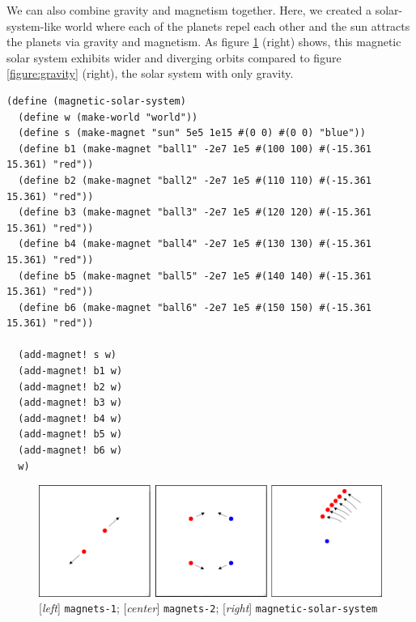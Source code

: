 \documentclass{article}
\begin{document}
We can also combine gravity and magnetism together. Here, we created a solar-system-like world where each of the planets repel each other and the sun attracts the planets via gravity and magnetism. As figure \ref{figure:magnetism} (right) shows, this magnetic solar system exhibits wider and diverging orbits compared to figure \ref{figure:gravity} (right), the solar system with only gravity. 
{\small\begin{verbatim}
(define (magnetic-solar-system)
  (define w (make-world "world"))
  (define s (make-magnet "sun" 5e5 1e15 #(0 0) #(0 0) "blue"))
  (define b1 (make-magnet "ball1" -2e7 1e5 #(100 100) #(-15.361 15.361) "red"))
  (define b2 (make-magnet "ball2" -2e7 1e5 #(110 110) #(-15.361 15.361) "red"))
  (define b3 (make-magnet "ball3" -2e7 1e5 #(120 120) #(-15.361 15.361) "red"))
  (define b4 (make-magnet "ball4" -2e7 1e5 #(130 130) #(-15.361 15.361) "red"))
  (define b5 (make-magnet "ball5" -2e7 1e5 #(140 140) #(-15.361 15.361) "red"))
  (define b6 (make-magnet "ball6" -2e7 1e5 #(150 150) #(-15.361 15.361) "red"))

  (add-magnet! s w)
  (add-magnet! b1 w)
  (add-magnet! b2 w)
  (add-magnet! b3 w)
  (add-magnet! b4 w)
  (add-magnet! b5 w)
  (add-magnet! b6 w)
  w)
\end{verbatim}}

\begin{figure}[h!]
  \centering
 \includegraphics[width=\textwidth,height=\textheight,keepaspectratio]{figs/magnetism.png}
  \caption{[\textit{left}] \texttt{magnets-1}; [\textit{center}] \texttt{magnets-2}; [\textit{right}] \texttt{magnetic-solar-system}}
  \label{figure:magnetism}
\end{figure}
\end{document}
